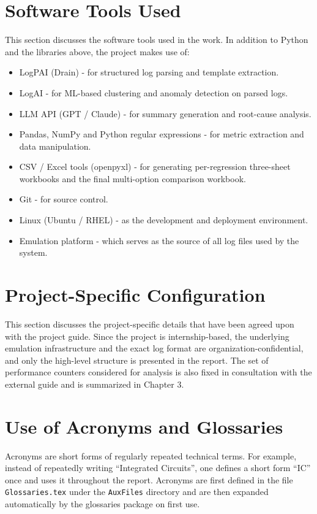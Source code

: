 \section{Software Tools Used}
This section discusses the software tools used in the work. In addition to Python and the libraries above, the project makes use of:
\begin{itemize}
\item LogPAI (Drain) - for structured log parsing and template extraction.
\item LogAI - for ML-based clustering and anomaly detection on parsed logs.
\item LLM API (GPT / Claude) - for summary generation and root-cause analysis.
\item Pandas, NumPy and Python regular expressions - for metric extraction and data manipulation.
\item CSV / Excel tools (openpyxl) - for generating per-regression three-sheet workbooks and the final multi-option comparison workbook.
\item Git - for source control.
\item Linux (Ubuntu / RHEL) - as the development and deployment environment.
\item Emulation platform - which serves as the source of all log files used by the system.
\end{itemize}

\section{Project-Specific Configuration}
This section discusses the project-specific details that have been agreed upon with the project guide. Since the project is internship-based, the underlying emulation infrastructure and the exact log format are organization-confidential, and only the high-level structure is presented in the report. The set of performance counters considered for analysis is also fixed in consultation with the external guide and is summarized in Chapter 3.


\section{Use of Acronyms and Glossaries}
Acronyms are short forms of regularly repeated technical terms. For example, instead of repeatedly writing ``Integrated Circuits'', one defines a short form ``IC'' once and uses it throughout the report. Acronyms are first defined in the file \texttt{Glossaries.tex} under the \texttt{AuxFiles} directory and are then expanded automatically by the glossaries package on first use.

